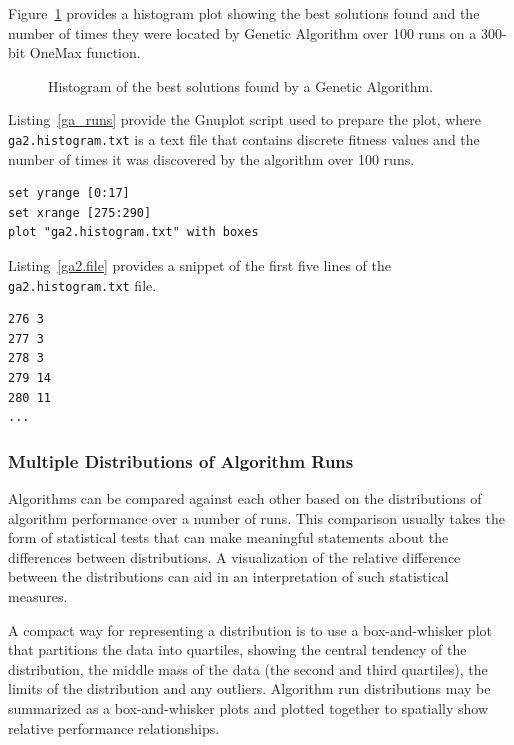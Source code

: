 Figure~\ref{plot:ga2} provides a histogram plot showing the best solutions found and the number of times they were located by Genetic Algorithm over 100 runs on a 300-bit OneMax function. 

\begin{figure}[htp]
\centering

\caption{Histogram of the best solutions found by a Genetic Algorithm.}
\label{plot:ga2}
\end{figure}

Listing~\ref{ga_runs} provide the Gnuplot script used to prepare the plot, where \texttt{ga2.histogram.txt} is a text file that contains discrete fitness values and the number of times it was discovered by the algorithm over 100 runs.

\begin{lstlisting}[caption=Gnuplot script for creating a histogram., label=ga_runs]
set yrange [0:17]
set xrange [275:290]
plot "ga2.histogram.txt" with boxes
\end{lstlisting}

Listing~\ref{ga2.file} provides a snippet of the first five lines of the \texttt{ga2.histogram.txt} file.

\begin{lstlisting}[caption=Snippet of the \texttt{ga2.histogram.txt} file., label=ga2.file]
276 3
277 3
278 3
279 14
280 11
...
\end{lstlisting}

\subsubsection{Multiple Distributions of Algorithm Runs}
Algorithms can be compared against each other based on the distributions of algorithm performance over a number of runs. This comparison usually takes the form of statistical tests that can make meaningful statements about the differences between distributions. A visualization of the relative difference between the distributions can aid in an interpretation of such statistical measures. 

A compact way for representing a distribution is to use a box-and-whisker plot that partitions the data into quartiles, showing the central tendency of the distribution, the middle mass of the data (the second and third quartiles), the limits of the distribution and any outliers. Algorithm run distributions may be summarized as a box-and-whisker plots and plotted together to spatially show relative performance relationships.

